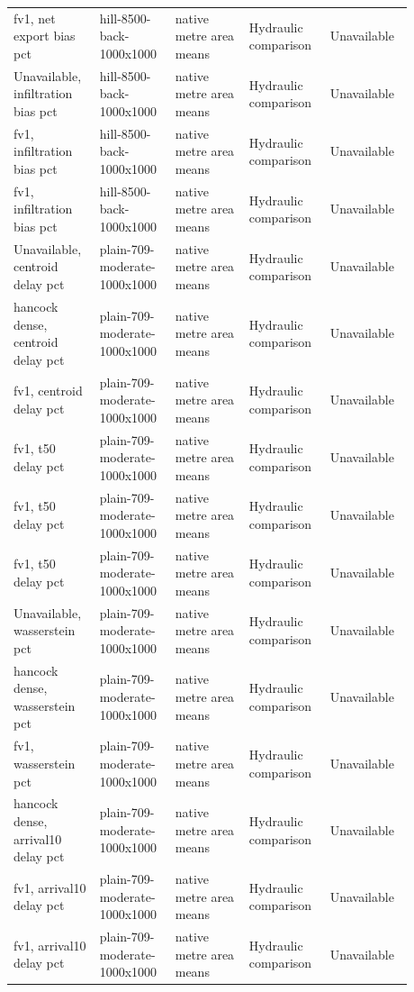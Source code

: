 \begin{longtable}{p{0.1760\linewidth}p{0.1760\linewidth}p{0.1760\linewidth}p{0.1760\linewidth}p{0.1760\linewidth}}
fv1, net export bias pct & hill-8500-back-1000x1000 & native metre area means & Hydraulic comparison & Unavailable \\
Unavailable, infiltration bias pct & hill-8500-back-1000x1000 & native metre area means & Hydraulic comparison & Unavailable \\
fv1, infiltration bias pct & hill-8500-back-1000x1000 & native metre area means & Hydraulic comparison & Unavailable \\
fv1, infiltration bias pct & hill-8500-back-1000x1000 & native metre area means & Hydraulic comparison & Unavailable \\
Unavailable, centroid delay pct & plain-709-moderate-1000x1000 & native metre area means & Hydraulic comparison & Unavailable \\
hancock dense, centroid delay pct & plain-709-moderate-1000x1000 & native metre area means & Hydraulic comparison & Unavailable \\
fv1, centroid delay pct & plain-709-moderate-1000x1000 & native metre area means & Hydraulic comparison & Unavailable \\
fv1, t50 delay pct & plain-709-moderate-1000x1000 & native metre area means & Hydraulic comparison & Unavailable \\
fv1, t50 delay pct & plain-709-moderate-1000x1000 & native metre area means & Hydraulic comparison & Unavailable \\
fv1, t50 delay pct & plain-709-moderate-1000x1000 & native metre area means & Hydraulic comparison & Unavailable \\
Unavailable, wasserstein pct & plain-709-moderate-1000x1000 & native metre area means & Hydraulic comparison & Unavailable \\
hancock dense, wasserstein pct & plain-709-moderate-1000x1000 & native metre area means & Hydraulic comparison & Unavailable \\
fv1, wasserstein pct & plain-709-moderate-1000x1000 & native metre area means & Hydraulic comparison & Unavailable \\
hancock dense, arrival10 delay pct & plain-709-moderate-1000x1000 & native metre area means & Hydraulic comparison & Unavailable \\
fv1, arrival10 delay pct & plain-709-moderate-1000x1000 & native metre area means & Hydraulic comparison & Unavailable \\
fv1, arrival10 delay pct & plain-709-moderate-1000x1000 & native metre area means & Hydraulic comparison & Unavailable \\

\end{longtable}
